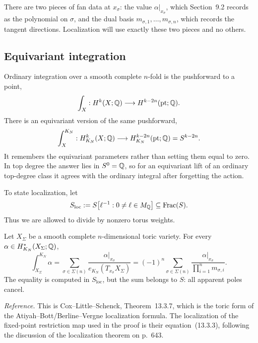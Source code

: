 \begin{pauseandthink}
There are two pieces of fan data at \(x_\sigma\): the value
\(\alpha|_{x_\sigma}\), which Section~9.2 records as the polynomial on
\(\sigma\), and the dual basis
\(m_{\sigma,1},\ldots,m_{\sigma,n}\), which records the tangent
directions.  Localization will use exactly these two pieces and no
others.
\end{pauseandthink}

\subsection{Equivariant integration}

Ordinary integration over a smooth complete \(n\)-fold is the
pushforward to a point,
\[
\int_X:H^k(X;\mathbb{Q})\longrightarrow H^{k-2n}(\mathrm{pt};\mathbb{Q}).
\]
There is an equivariant version of the same pushforward,
\[
\int_X^{K_N}:
H_{K_N}^k(X;\mathbb{Q})
\longrightarrow
H_{K_N}^{k-2n}(\mathrm{pt};\mathbb{Q})=S^{k-2n}.
\]
It remembers the equivariant parameters rather than setting them equal
to zero.  In top degree the answer lies in \(S^0=\mathbb{Q}\), so for an
equivariant lift of an ordinary top-degree class it agrees with the
ordinary integral after forgetting the action.

To state localization, let
\[
S_{\mathrm{loc}}
:=
S\bigl[\ell^{-1}:0\ne\ell\in M_{\mathbb{Q}}\bigr]
\subseteq\operatorname{Frac}(S).
\]
Thus we are allowed to divide by nonzero torus weights.

\begin{theorem}
\label{thm:atiyah-bott-toric-localization}
Let \(X_\Sigma\) be a smooth complete \(n\)-dimensional toric variety.
For every \(\alpha\in H_{K_N}^*(X_\Sigma;\mathbb{Q})\),
\[
\boxed{
\int_{X_\Sigma}^{K_N}\alpha
=
\sum_{\sigma\in\Sigma(n)}
\frac{\alpha|_{x_\sigma}}
{e_{K_N}(T_{x_\sigma}X_\Sigma)}
=
(-1)^n
\sum_{\sigma\in\Sigma(n)}
\frac{\alpha|_{x_\sigma}}
{\prod_{i=1}^n m_{\sigma,i}}.
}
\]
The equality is computed in \(S_{\mathrm{loc}}\), but the sum belongs
to \(S\): all apparent poles cancel.
\end{theorem}

\noindent
\textit{Reference.}
This is Cox--Little--Schenck, Theorem~13.3.7, which is the toric form of
the Atiyah--Bott/Berline--Vergne localization formula.  The localization
of the fixed-point restriction map used in the proof is their
equation~(13.3.3), following the discussion of the localization theorem
on p.~643.


